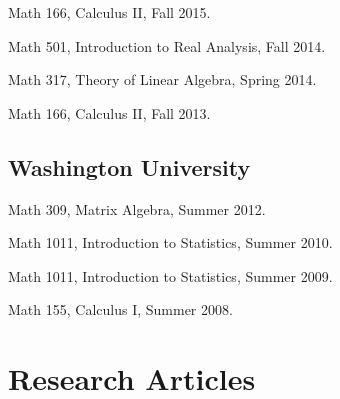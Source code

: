 \documentclass[10pt,letterpaper]{article}
\renewenvironment{itemize}{
  \begin{list}{}{
    \setlength{\leftmargin}{1.5em}
    \setlength{\itemsep}{0.25em}
    \setlength{\parskip}{0pt}
    \setlength{\parsep}{0.25em}
  }
}{
  \end{list}
}
\begin{document}
\begin{itemize}
\item
  Math 166, Calculus II, Fall 2015.
\item
  Math 501, Introduction to Real Analysis, Fall 2014.
\item
  Math 317, Theory of Linear Algebra, Spring 2014.
\item
  Math 166, Calculus II, Fall 2013.
\end{itemize}

\hypertarget{washington-university}{%
\subsection*{Washington University}\label{washington-university}}

\begin{itemize}
\item
  Math 309, Matrix Algebra, Summer 2012.
\item
  Math 1011, Introduction to Statistics, Summer 2010.
\item
  Math 1011, Introduction to Statistics, Summer 2009.
\item
  Math 155, Calculus I, Summer 2008.
\end{itemize}

\hypertarget{research-articles}{%
\section*{Research Articles}\label{research-articles}}
\end{document}
